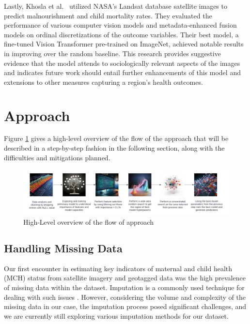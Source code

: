 \documentclass{article}
\begin{document}
Lastly, Khosla et al.~\cite{khosla} utilized NASA’s Landsat database satellite images to predict malnourishment and child mortality rates. They evaluated the performance of various computer vision models and metadata-enhanced fusion models on ordinal discretizations of the outcome variables. Their best model, a fine-tuned Vision Transformer pre-trained on ImageNet, achieved notable results in improving over the random baseline. This research provides suggestive evidence that the model attends to sociologically relevant aspects of the images and indicates future work should entail further enhancements of this model and extensions to other measures capturing a region's health outcomes.


\section{Approach}
Figure \ref{fig:approach} gives a high-level overview of the flow of the approach that will be described in a step-by-step fashion in the following section, along with the difficulties and mitigations planned.

\begin{figure}[!h]
    \centering
    \includegraphics[width=\textwidth]{./images/approach.png}
    \caption{High-Level overview of the flow of approach}
    \label{fig:approach}
\end{figure}

\subsection{Handling Missing Data}
Our first encounter in estimating key indicators of maternal and child health (MCH) status from satellite imagery and geotagged data was the high prevalence of missing data within the dataset. Imputation is a commonly used technique for dealing with such issues \cite{Rubin2004}. However, considering the volume and complexity of the missing data in our case, the imputation process posed significant challenges, and we are currently still exploring various imputation methods for our dataset.
\end{document}
